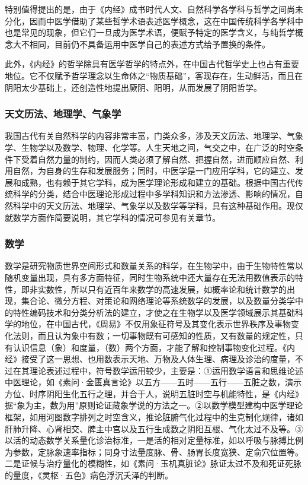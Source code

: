 \documentclass[draft,12pt]{ctexbook}
\begin{document}
特别值得提出的是，由于《内经》成书时代人文、自然科学各学科与哲学之间尚未分化，因而中医学借助了某些哲学术语表述医学概念，这在中国传统科学各学科中也是常见的现象，但它们一旦成为医学术语，便赋予特定的医学含义，与纯哲学概念大不相同，目前仍不具备运用中医学自己的表述方式给予置换的条件。

此外，《内经》的哲学除具有医学哲学的特点外，在中国古代哲学史上也占有重要地位。它不仅赋予哲学理念以生命体之“物质基础”，客现存在，生动鲜活，而且在阴阳太少基础上，还创造性地提出厥阴、阳明，从而发展了阴阳哲学。

\subsubsection{天文历法、地理学、气象学}%

我国古代有关自然科学的内容非常丰富，门类众多，涉及天文历法、地理学、气象学、生物学以及数学、物理、化学等。人生天地之间，气交之中，在广泛的时空条件下受着自然力量的制约，因而人类必须了解自然、把握自然，进而顺应自然、利用自然，为自身的生存和发展服务；同时，中医学是一门应用学科，它的建立、发展和成熟，也有赖于其它学科，成为医学理论形成和建立的基础。根据中国古代传统科学的分类，结合中医理论形成过程中多学科知识和方法渗透、影响的情况，自然科学中的天文历法、地理学、气象学以及数学等学科，具有这种基础作用。现仅就数学方面作简要说明，其它学科的情况可参见有关章节。

\subsubsection{数学}%

数学是研究物质世界空间形式和数量关系的科学，在生物学中，由于生物特性常以随机变量出现，具有多方面特征，同时生物系统中还大量存在无法用数值表示的特性，即非实数性，所以只有近百年来数学的高速发展，如概率论和统计数学的出现，集合论、微分方程、对策论和网络理论等系统数学的发展，以及数量分类学中的特性编码技术和分类分析法的建立，才使之在生物学以及医学领域展示其基础科学的地位，在中国古代，《周易》不仅用象征符号及其变化表示世界秩序及事物变化法则，而且认为象中有数；一切事物既有可感知的性质，又有数量的规定性，只有认识信息（象）和度量，（数）两个方面，才能了解和控制事物变化过程。《内经》接受了这一思想、也用数表示天地、万物及人体生理、病理及诊治的度量，不过在其理论表述过程中，符号数学运用较少，主要是：①运用数学语言和思维论述中医理论，如《素问·金匮真言论》以五方——五时——五行——五脏之数，演示方位、时序阴阳生化五行之理，并合于人，说明五脏时空与机能特性，是《内经》据“象为主，数为用”原则论证藏象学说的方法之一。②以数学模型建构中医学理论框架，如用河图数字排列之时空含义，推论脏腑气化过程中的生克制化规律，诸如肝肺升降、心肾相交、脾主中宫以及五行生成数之阴阳互根、气化太过不及等。③以活的动态数学关系量化诊治标准，一是活的相对定量标准，如以呼吸与脉搏比例为参数，定脉象速率指标；同身寸法量度脉、骨、肠胃长度宽狭、定俞穴位置等。二是证候与治疗量化的模糊性，如《素问·玉机真脏论》脉证太过不及和死证死脉的量度，《灵枢·五色》病色浮沉夭泽的判断。
\end{document}
